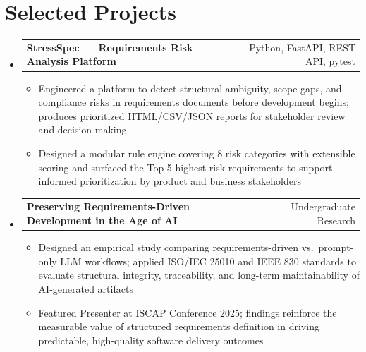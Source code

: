 \documentclass[letterpaper,10pt]{article}
\makeatletter
\newcommand{\resumeItem}[1]{
  \item\small{{#1 \vspace{-2pt}}}
}
\newcommand{\resumeProjectHeading}[2]{
    \item
    \begin{tabular*}{0.97\textwidth}{l@{\extracolsep{\fill}}r}
      \small#1 & #2 \\
    \end{tabular*}\vspace{-7pt}
}
\newcommand{\resumeSubHeadingListStart}{\begin{itemize}[leftmargin=0.15in, label={}]}
\newcommand{\resumeSubHeadingListEnd}{\end{itemize}}
\newcommand{\resumeItemListStart}{\begin{itemize}}
\newcommand{\resumeItemListEnd}{\end{itemize}\vspace{-5pt}}
\makeatother
\begin{document}
\section{Selected Projects}
\resumeSubHeadingListStart

\resumeProjectHeading
{\textbf{StressSpec --- Requirements Risk Analysis Platform}}{Python, FastAPI, REST API, pytest}
\resumeItemListStart
\resumeItem{Engineered a platform to detect structural ambiguity, scope gaps, and compliance risks in requirements documents before development begins; produces prioritized HTML/CSV/JSON reports for stakeholder review and decision-making}
\resumeItem{Designed a modular rule engine covering 8 risk categories with extensible scoring and surfaced the Top 5 highest-risk requirements to support informed prioritization by product and business stakeholders}
\resumeItemListEnd

\resumeProjectHeading
{\textbf{Preserving Requirements-Driven Development in the Age of AI}}{Undergraduate Research}
\resumeItemListStart
\resumeItem{Designed an empirical study comparing requirements-driven vs.\ prompt-only LLM workflows; applied ISO/IEC 25010 and IEEE 830 standards to evaluate structural integrity, traceability, and long-term maintainability of AI-generated artifacts}
\resumeItem{Featured Presenter at ISCAP Conference 2025; findings reinforce the measurable value of structured requirements definition in driving predictable, high-quality software delivery outcomes}
\resumeItemListEnd

\resumeSubHeadingListEnd
\end{document}

